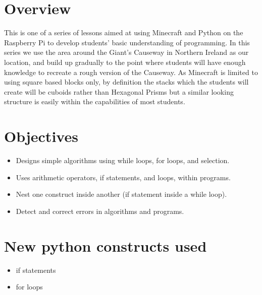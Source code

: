 \documentclass{geocraft-lesson-plan}
\begin{document}
\subtitle{Part 3 - Selection}

\section*{Overview} This is one of a series of lessons aimed at using Minecraft and Python on the Raspberry Pi to
develop students' basic understanding of programming. In this series we use the area around the Giant's Causeway in
Northern Ireland as our location, and build up gradually to the point where students will have enough knowledge to
recreate a rough version of the Causeway. As Minecraft is limited to using square based blocks only, by definition the
stacks which the students will create will be cuboids rather than Hexagonal Prisms but a similar looking structure is
easily within the capabilities of most students.

\section*{Objectives}
\begin{itemize}
\item Designs simple algorithms using while loops, for loops, and selection.
\item Uses arithmetic operators, if statements, and loops, within programs.
\item Nest one construct inside another (if statement inside a while loop).
\item Detect and correct errors in algorithms and programs.
\end{itemize}


\section*{New python constructs used}
\begin{itemize}
\item if statements
\item for loops
\end{itemize}
\end{document}

